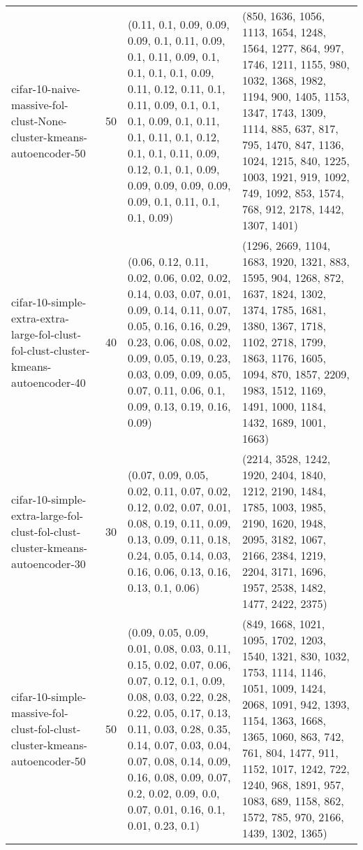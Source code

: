 \begin{longtable}{llll}
                                          cifar-10-naive-massive-fol-clust-None-cluster-kmeans-autoencoder-50 &             50 &                   (0.11, 0.1, 0.09, 0.09, 0.09, 0.1, 0.11, 0.09, 0.1, 0.11, 0.09, 0.1, 0.1, 0.1, 0.1, 0.09, 0.11, 0.12, 0.11, 0.1, 0.11, 0.09, 0.1, 0.1, 0.1, 0.09, 0.1, 0.11, 0.1, 0.11, 0.1, 0.12, 0.1, 0.1, 0.11, 0.09, 0.12, 0.1, 0.1, 0.09, 0.09, 0.09, 0.09, 0.09, 0.09, 0.1, 0.11, 0.1, 0.1, 0.09) &              (850, 1636, 1056, 1113, 1654, 1248, 1564, 1277, 864, 997, 1746, 1211, 1155, 980, 1032, 1368, 1982, 1194, 900, 1405, 1153, 1347, 1743, 1309, 1114, 885, 637, 817, 795, 1470, 847, 1136, 1024, 1215, 840, 1225, 1003, 1921, 919, 1092, 749, 1092, 853, 1574, 768, 912, 2178, 1442, 1307, 1401) \\
                          cifar-10-simple-extra-extra-large-fol-clust-fol-clust-cluster-kmeans-autoencoder-40 &             40 &                                                           (0.06, 0.12, 0.11, 0.02, 0.06, 0.02, 0.02, 0.14, 0.03, 0.07, 0.01, 0.09, 0.14, 0.11, 0.07, 0.05, 0.16, 0.16, 0.29, 0.23, 0.06, 0.08, 0.02, 0.09, 0.05, 0.19, 0.23, 0.03, 0.09, 0.09, 0.05, 0.07, 0.11, 0.06, 0.1, 0.09, 0.13, 0.19, 0.16, 0.09) &                                                              (1296, 2669, 1104, 1683, 1920, 1321, 883, 1595, 904, 1268, 872, 1637, 1824, 1302, 1374, 1785, 1681, 1380, 1367, 1718, 1102, 2718, 1799, 1863, 1176, 1605, 1094, 870, 1857, 2209, 1983, 1512, 1169, 1491, 1000, 1184, 1432, 1689, 1001, 1663) \\
                                cifar-10-simple-extra-large-fol-clust-fol-clust-cluster-kmeans-autoencoder-30 &             30 &                                                                                                                       (0.07, 0.09, 0.05, 0.02, 0.11, 0.07, 0.02, 0.12, 0.02, 0.07, 0.01, 0.08, 0.19, 0.11, 0.09, 0.13, 0.09, 0.11, 0.18, 0.24, 0.05, 0.14, 0.03, 0.16, 0.06, 0.13, 0.16, 0.13, 0.1, 0.06) &                                                                                                                      (2214, 3528, 1242, 1920, 2404, 1840, 1212, 2190, 1484, 1785, 1003, 1985, 2190, 1620, 1948, 2095, 3182, 1067, 2166, 2384, 1219, 2204, 3171, 1696, 1957, 2538, 1482, 1477, 2422, 2375) \\
                                    cifar-10-simple-massive-fol-clust-fol-clust-cluster-kmeans-autoencoder-50 &             50 &   (0.09, 0.05, 0.09, 0.01, 0.08, 0.03, 0.11, 0.15, 0.02, 0.07, 0.06, 0.07, 0.12, 0.1, 0.09, 0.08, 0.03, 0.22, 0.28, 0.22, 0.05, 0.17, 0.13, 0.11, 0.03, 0.28, 0.35, 0.14, 0.07, 0.03, 0.04, 0.07, 0.08, 0.14, 0.09, 0.16, 0.08, 0.09, 0.07, 0.2, 0.02, 0.09, 0.0, 0.07, 0.01, 0.16, 0.1, 0.01, 0.23, 0.1) &             (849, 1668, 1021, 1095, 1702, 1203, 1540, 1321, 830, 1032, 1753, 1114, 1146, 1051, 1009, 1424, 2068, 1091, 942, 1393, 1154, 1363, 1668, 1365, 1060, 863, 742, 761, 804, 1477, 911, 1152, 1017, 1242, 722, 1240, 968, 1891, 957, 1083, 689, 1158, 862, 1572, 785, 970, 2166, 1439, 1302, 1365) \\

\end{longtable}
